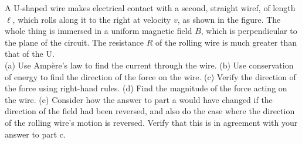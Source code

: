 A U-shaped wire makes electrical contact with a second, straight wiref, of length $\ell$, which rolls along it to the
right at velocity $v$,
as shown in the figure. The whole thing is immersed in a uniform magnetic field $B$, which is
perpendicular to the plane of the circuit. The resistance $R$ of the rolling wire is much
greater than that of the U.\\
(a) Use Amp\`{e}re's law to find the current through the wire.\answercheck\hwendpart
(b) Use conservation of energy to find the direction of the force on the wire.\hwendpart
(c) Verify the direction of the force using right-hand rules.\hwendpart
(d) Find the magnitude of the force acting on the wire.\answercheck\hwendpart
(e) Consider how the answer to part a would have changed if the direction of the field had been
reversed, and also do the case where the direction of the rolling wire's motion is reversed.
Verify that this is in agreement with your answer to part c.
